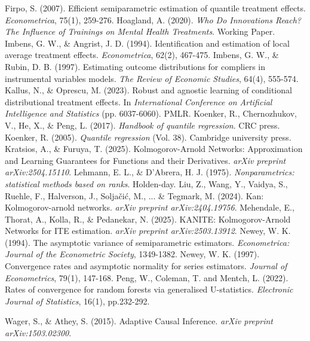 \documentclass[final,3p,fleqn, 10pt]{elsarticle}
\begin{document}
\begin{thebibliography}{99}
 Firpo, S. (2007). Efficient semiparametric estimation of quantile treatment effects. \textit{Econometrica}, 75(1), 259-276.
 Hoagland, A. (2020). \textit{Who Do Innovations Reach? The Influence of Trainings on Mental Health Treatments}. Working Paper.
 Imbens, G. W., \& Angrist, J. D. (1994). Identification and estimation of local average treatment effects. \textit{Econometrica}, 62(2), 467-475.
 Imbens, G. W., \& Rubin, D. B. (1997). Estimating outcome distributions for compliers in instrumental variables models. \textit{The Review of Economic Studies}, 64(4), 555-574.
 Kallus, N., \& Oprescu, M. (2023). Robust and agnostic learning of conditional distributional treatment effects. In \textit{International Conference on Artificial Intelligence and Statistics} (pp. 6037-6060). PMLR.
 Koenker, R., Chernozhukov, V., He, X., \& Peng, L. (2017). \textit{Handbook of quantile regression}. CRC press.
 Koenker, R. (2005). \textit{Quantile regression} (Vol. 38). Cambridge university press.
 Kratsios, A., \& Furuya, T. (2025). Kolmogorov-Arnold Networks: Approximation and Learning Guarantees for Functions and their Derivatives. \textit{arXiv preprint arXiv:2504.15110}.
 Lehmann, E. L., \& D'Abrera, H. J. (1975). \textit{Nonparametrics: statistical methods based on ranks}. Holden-day.
 Liu, Z., Wang, Y., Vaidya, S., Ruehle, F., Halverson, J., Solja{\v{c}}i{\'c}, M., ... \& Tegmark, M. (2024). Kan: Kolmogorov-arnold networks. \textit{arXiv preprint arXiv:2404.19756}.
 Mehendale, E., Thorat, A., Kolla, R., \& Pedanekar, N. (2025). KANITE: Kolmogorov-Arnold Networks for ITE estimation. \textit{arXiv preprint arXiv:2503.13912}.
 Newey, W. K. (1994). The asymptotic variance of semiparametric estimators. \textit{Econometrica: Journal of the Econometric Society}, 1349-1382.
 Newey, W. K. (1997). Convergence rates and asymptotic normality for series estimators. \textit{Journal of Econometrics}, 79(1), 147-168. %
 Peng, W., Coleman, T. and Mentch, L. (2022). Rates of convergence for random forests via generalised U-statistics. \textit{Electronic Journal of Statistics}, 16(1), pp.232-292. %

 Wager, S., \& Athey, S. (2015). Adaptive Causal Inference. \textit{arXiv preprint arXiv:1503.02300}. %


\end{thebibliography}
\end{document}
